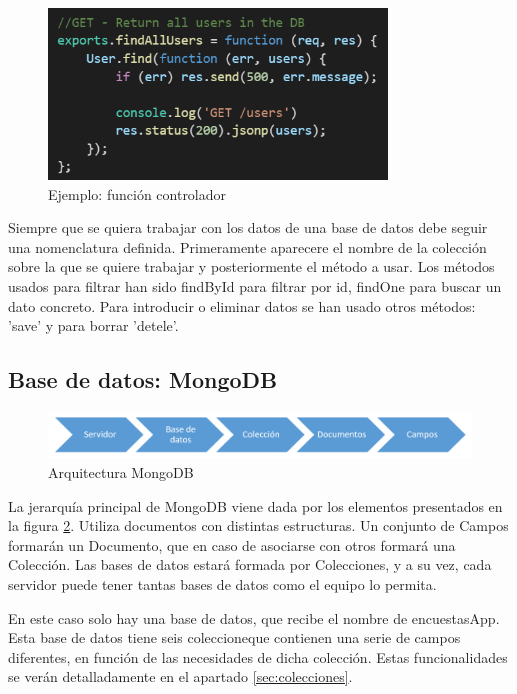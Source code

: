 \documentclass[a4paper, 12pt]{book}
\begin{document}
\begin{figure}[H]
  \centering
  \includegraphics[width=9cm, keepaspectratio]{img/controller.png}
  \caption{Ejemplo: funci\'on controlador}
  \label{f:controller}
\end{figure}

Siempre que se quiera trabajar con los datos de una base de datos debe
seguir una nomenclatura definida. Primeramente aparecere el nombre de la colecci\'on sobre la que se quiere
trabajar y posteriormente el m\'etodo a usar. Los m\'etodos usados para filtrar han sido findById para filtrar por id, findOne para buscar un dato concreto. Para introducir o eliminar datos se han usado otros m\'etodos: 'save' y para borrar 'detele'.


\subsection{Base de datos: MongoDB} 
\label{sec:base_datos_mongo}

\begin{figure}[H]
  \centering
  \includegraphics[width=14cm, keepaspectratio]{img/arq_mongo.png}
  \caption{Arquitectura MongoDB}
  \label{f:arq_mongo}
\end{figure}

La jerarqu\'ia principal de MongoDB viene dada por los elementos
presentados en la figura \ref{f:arq_mongo}. Utiliza documentos con distintas estructuras. Un
conjunto de Campos formar\'an un Documento, que en caso de asociarse con
otros formar\'a una Colecci\'on. Las bases de datos estar\'a formada por
Colecciones, y a su vez, cada servidor puede tener tantas bases de datos como el
equipo lo permita.

En este caso solo hay una base de datos, que recibe el nombre de encuestasApp. Esta base de datos tiene seis coleccioneque contienen  una serie de campos diferentes, en funci\'on de las necesidades de dicha colecci\'on. Estas funcionalidades se ver\'an detalladamente en el apartado \ref{sec:colecciones}.
\end{document}

